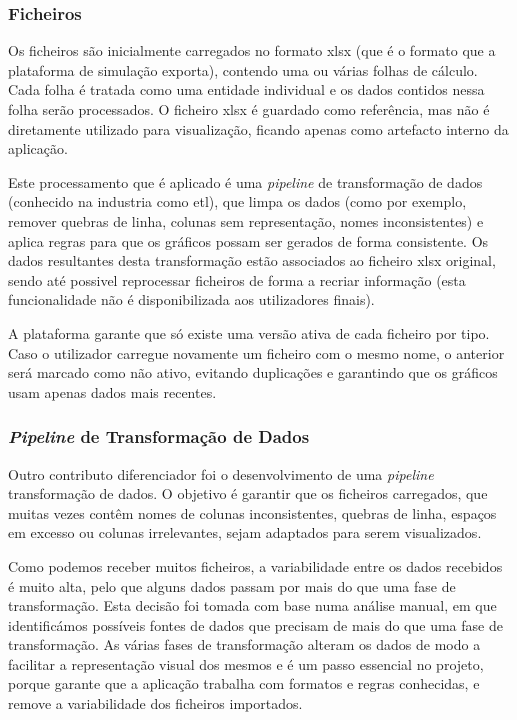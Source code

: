 \subsubsection{Ficheiros}

Os ficheiros são inicialmente carregados no formato \gls{xlsx} (que é o formato que a plataforma de simulação exporta), contendo uma ou várias folhas de cálculo. Cada folha é tratada como uma entidade individual e os dados contidos nessa folha serão processados. O ficheiro \gls{xlsx} é guardado como referência, mas não é diretamente utilizado para visualização, ficando apenas como artefacto interno da aplicação.

Este processamento que é aplicado é uma \textit{pipeline} de transformação de dados (conhecido na industria como \gls{etl}), que limpa os dados (como por exemplo, remover quebras de linha, colunas sem representação, nomes inconsistentes) e aplica regras para que os gráficos possam ser gerados de forma consistente. Os dados resultantes desta transformação estão associados ao ficheiro \gls{xlsx} original, sendo até possivel reprocessar ficheiros de forma a recriar informação (esta funcionalidade não é disponibilizada aos utilizadores finais).

A plataforma garante que só existe uma versão ativa de cada ficheiro por tipo. Caso o utilizador carregue novamente um ficheiro com o mesmo nome, o anterior será marcado como não ativo, evitando duplicações e garantindo que os gráficos usam apenas dados mais recentes. 

\subsubsection{\textit{Pipeline} de Transformação de Dados}

Outro contributo diferenciador foi o desenvolvimento de uma \textit{pipeline} transformação de dados. O objetivo é garantir que os ficheiros carregados, que muitas vezes contêm nomes de colunas inconsistentes, quebras de linha, espaços em excesso ou colunas irrelevantes, sejam adaptados para serem visualizados. 

Como podemos receber muitos ficheiros, a variabilidade entre os dados recebidos é muito alta, pelo que alguns dados passam por mais do que uma fase de transformação. Esta decisão foi tomada com base numa análise manual, em que identificámos possíveis fontes de dados que precisam de mais do que uma fase de transformação. As várias fases de transformação alteram os dados de modo a facilitar a representação visual dos mesmos e é um passo essencial no projeto, porque garante que a aplicação trabalha com formatos e regras conhecidas, e remove a variabilidade dos ficheiros importados.

